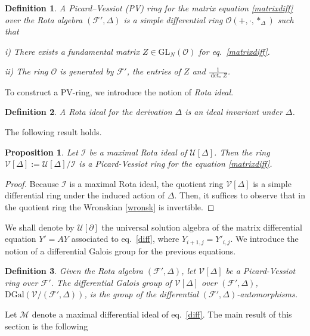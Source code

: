 \documentclass[10pt]{amsart}
\numberwithin{equation}{section}
\newtheorem{definition}{Definition}
\newtheorem{proposition}{Proposition}
\theoremstyle{definition}
\begin{document}
\begin{definition}
A Picard--Vessiot (PV) ring for the matrix equation \eqref{matrixdiff} over the Rota algebra $(\mathcal{F}',\Delta )$ is a simple differential ring $\mathcal{O}(+,\cdot,*_{\Delta})$ such that

i) There exists a fundamental matrix
$Z\in \text{GL}_{N}(\mathcal{O})$ for eq.~\eqref{matrixdiff}.

ii) The ring $\mathcal{O}$ is generated by $\mathcal{F}'$, the entries of
$Z$ and $\frac{1}{{\det}_* Z}$.
\end{definition}
To construct a PV-ring, we introduce the notion of \textit{Rota ideal}.
\begin{definition}
\label{defn11}
A \textit{Rota ideal} for the derivation $\Delta$ is an ideal invariant under  $\Delta$.
\end{definition}
The following result holds.
\begin{proposition}
\label{prop3}
Let $\mathcal{I}$ be a maximal Rota ideal of
$\mathcal{U}[\Delta ]$. Then the ring
$\mathcal{V}[\Delta ]:=\mathcal{U}[\Delta ]/\mathcal{I}$ is a
\textit{Picard-Vessiot ring} for the equation \eqref{matrixdiff}.
\end{proposition}
\begin{proof}
Because $\mathcal{I}$ is a maximal Rota ideal, the quotient ring $\mathcal{V}[\Delta]$ is a simple differential ring under the induced action of $\Delta$. Then, it suffices to observe that in the quotient ring the Wronskian \eqref{wronsk} is invertible.
\end{proof}
We shall denote by $\mathcal{U}[\partial ]$ the universal solution algebra of the matrix differential
equation $Y'=AY$ associated to eq.~\eqref{diff}, where
$Y_{i+1,j}= Y'_{i,j}$. We introduce the notion of a differential Galois
group for the previous equations.

\begin{definition}
\label{defn12}
Given the Rota algebra $(\mathcal{F}',\Delta )$, let
$\mathcal{V}[\Delta ]$ be a Picard-Vessiot ring over $\mathcal{F}'$. The
differential Galois group of $\mathcal{V}[\Delta ]$ over
$(\mathcal{F}',\Delta )$,
$\text{DGal}\left (\mathcal{V}/ (\mathcal{F}',\Delta )\right )$, is the group
of the differential $(\mathcal{F}',\Delta )$-automorphisms.
\end{definition}
Let $\mathcal{M}$ denote a maximal differential ideal of eq.~\eqref{diff}. The main result of this section is the following
\end{document}
